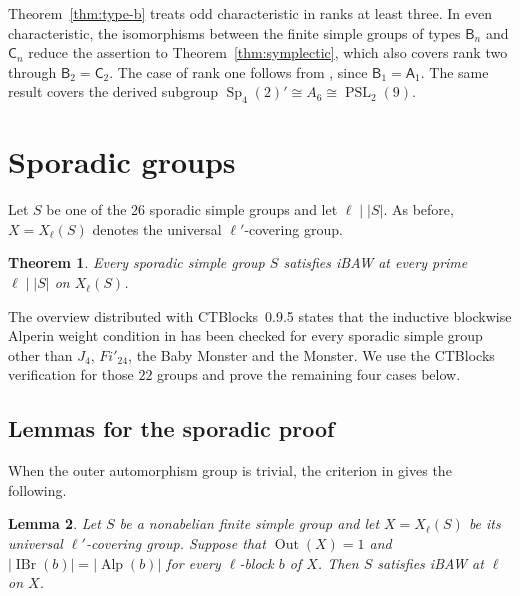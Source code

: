 \documentclass[10pt]{amsart}
\newtheorem{theorem}{Theorem}[section]
\newtheorem{lemma}[theorem]{Lemma}
\theoremstyle{definition}
\let\oldendproof\endproof
\renewenvironment{proof}[1][\proofname]{%
  \oldproof[\bfseries #1]%
}{\oldendproof}
\DeclareMathOperator{\Out}{Out}
\DeclareMathOperator{\IBr}{IBr}
\DeclareMathOperator{\Alp}{Alp}
\DeclareMathOperator{\Sp}{Sp}
\numberwithin{equation}{section}
\numberwithin{table}{section}
\begin{document}
\begin{proof}
Theorem~\ref{thm:type-b} treats odd characteristic in ranks at least
three. In even characteristic, the isomorphisms between the finite simple
groups of types $\mathsf B_n$ and $\mathsf C_n$ reduce the assertion to
Theorem~\ref{thm:symplectic}, which also covers rank two through
$\mathsf B_2=\mathsf C_2$. The case of rank one follows from
\cite[Proposition~4.6]{FengLiZhang2023LowRankA}, since
$\mathsf B_1=\mathsf A_1$. The same result covers the derived subgroup
$\Sp_4(2)'\cong A_6\cong\operatorname{PSL}_2(9)$.
\end{proof}

\section{Sporadic groups}\label{sec:sporadic}

Let $S$ be one of the $26$ sporadic simple groups and let
$\ell\mid |S|$.  As before, $X=X_\ell(S)$ denotes the universal
$\ell'$-covering group.

\begin{theorem}\label{thm:sporadic}
Every sporadic simple group $S$ satisfies iBAW at every prime
$\ell\mid |S|$ on $X_\ell(S)$.
\end{theorem}

The overview distributed with CTBlocks~0.9.5
\cite{BreuerSporadicOverview} states that the inductive blockwise
Alperin weight condition in \cite[Definition~4.1]{Spath2013} has been
checked for every sporadic simple group other than $J_4$, $Fi'_{24}$,
the Baby Monster and the Monster. We use the CTBlocks verification for
those $22$ groups and prove the remaining four cases below.

\subsection{Lemmas for the sporadic proof}

When the outer automorphism group is trivial, the criterion in
\cite[Corollary~2.13]{FengLiZhang2019} gives the following.

\begin{lemma}\label{lem:complete-collapse}
Let $S$ be a nonabelian finite simple group and let
$X=X_\ell(S)$ be its universal $\ell'$-covering group.  Suppose that
$\Out(X)=1$ and $|\IBr(b)|=|\Alp(b)|$ for every $\ell$-block $b$ of
$X$.  Then $S$ satisfies iBAW at $\ell$ on $X$.
\end{lemma}
\end{document}
